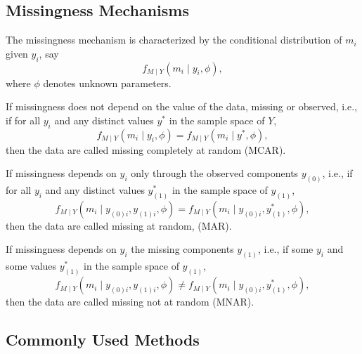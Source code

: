 \subsection{Missingness Mechanisms}

The missingness mechanism is characterized by the conditional distribution of \(m_{i}\) given \(y_{i}\), say
\begin{equation}
	f_{M\mid Y}\left(m_{i}\mid y_{i},\phi\right),
\end{equation}
where \(\phi\) denotes unknown parameters.

\begin{definition}
	If missingness does not depend on the value of the data, missing or observed, i.e., if for all \(y_{i}\) and any distinct values \(y^{*}\) in the sample space of \(Y\),
	\begin{equation}
		f_{M\mid Y}\left(m_{i} \mid y_{i},\phi\right)=f_{M\mid Y}\left(m_{i} \mid y^{*},\phi\right),
	\end{equation}
	then the data are called missing completely at random (MCAR).
\end{definition}

\begin{definition}
	If missingness depends on \(y_{i}\) only through the observed components \(y_{(0)}\), i.e., if for all \(y_{i}\) and any distinct values \(y_{(1)}^{*}\) in the sample space of \(y_{(1)}\),
	\begin{equation}
		f_{M \mid Y}\left(m_{i}\mid y_{(0)i},y_{(1)i},\phi\right)=f_{M\mid Y}\left(m_{i}\mid y_{(0)i},y_{(1)}^{*},\phi\right),
	\end{equation}
	then the data are called missing at random, (MAR).
\end{definition}

\begin{definition}
	If missingness depends on \(y_{i}\) the missing components \(y_{(1)}\), i.e., if some \(y_{i}\) and some values \(y_{(1)}^{*}\) in the sample space of \(y_{(1)}\),
	\begin{equation}
		f_{M \mid Y}\left(m_{i}\mid y_{(0)i},y_{(1)i},\phi\right)\neq f_{M\mid Y}\left(m_{i}\mid y_{(0)i},y_{(1)}^{*},\phi\right),
	\end{equation}
	then the data are called missing not at random (MNAR).
\end{definition}

\subsection{Commonly Used Methods}

